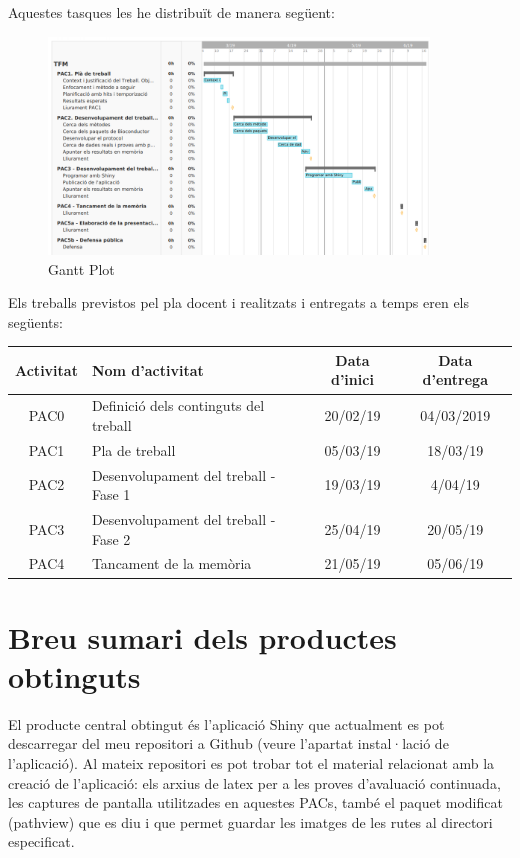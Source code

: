 Aquestes tasques les he distribuït de manera següent: 

\begin{figure}[H]
\caption{Gantt Plot}
\centering
\includegraphics[width=0.9\textwidth]{figures/GanttPlot}
\end{figure}

Els treballs previstos pel pla docent i realitzats i entregats a temps eren els següents: 

\begin{center}
\begin{tabular}{||c | l | c | c||} 
\hline
Activitat & Nom d'activitat & Data d'inici & Data d'entrega \\ [0.5ex] 
\hline\hline
PAC0 & Definició dels continguts del treball & 20/02/19 & 04/03/2019 \\ 
\hline
PAC1 & Pla de treball & 05/03/19 & 18/03/19 \\
\hline
PAC2 & Desenvolupament del treball - Fase 1 & 19/03/19 & 4/04/19 \\
\hline
PAC3 & Desenvolupament del treball - Fase 2 & 25/04/19 & 20/05/19 \\
\hline
PAC4 & Tancament de la memòria & 21/05/19 & 05/06/19 \\
\hline
\end{tabular}
\end{center}

\section{Breu sumari dels productes obtinguts}

El producte central obtingut és l'aplicació Shiny que actualment es pot descarregar del meu repositori a Github (veure l'apartat instal·lació de l'aplicació). Al mateix repositori es pot trobar tot el material relacionat amb la creació de l'aplicació: els arxius de latex per a les proves d'avaluació continuada, les captures de pantalla utilitzades en aquestes PACs, també el paquet modificat \helvetica(pathview) que es diu  i que permet guardar les imatges de les rutes al directori especificat.


